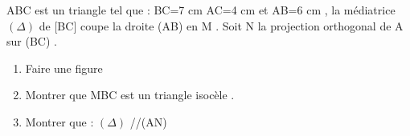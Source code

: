 \documentclass[a4paper,12pt]{article}
\begin{document}
\begin{exo}
ABC est un triangle tel que : BC=7 cm AC=4 cm et AB=6 cm , la médiatrice $(\Delta)$  de [BC] coupe la droite (AB) en M .
\newline
Soit N la projection orthogonal de A sur (BC) .
\begin{enumerate}
\item Faire une figure 
\item Montrer que MBC est un triangle isocèle .
\item Montrer que : $(\Delta)$ //(AN)
\end{enumerate}
\end{exo}
\end{document}
